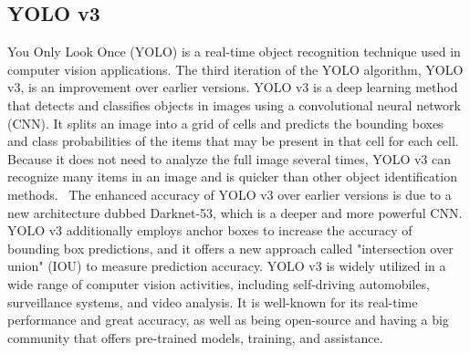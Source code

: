 \documentclass[11pt, a4paper, openany]{book}
\begin{document}
\subsection{YOLO v3}
You Only Look Once (YOLO) is a real-time object recognition technique used in computer vision applications. The third iteration of the YOLO algorithm, YOLO v3, is an improvement over earlier versions.
YOLO v3 is a deep learning method that detects and classifies objects in images using a convolutional neural network (CNN). It splits an image into a grid of cells and predicts the bounding boxes and class probabilities of the items that may be present in that cell for each cell. Because it does not need to analyze the full image several times, YOLO v3 can recognize many items in an image and is quicker than other object identification methods.~\cite{redmon2018yolov3}\newline
The enhanced accuracy of YOLO v3 over earlier versions is due to a new architecture dubbed Darknet-53, which is a deeper and more powerful CNN. YOLO v3 additionally employs anchor boxes to increase the accuracy of bounding box predictions, and it offers a new approach called "intersection over union" (IOU) to measure prediction accuracy.
YOLO v3 is widely utilized in a wide range of computer vision activities, including self-driving automobiles, surveillance systems, and video analysis. It is well-known for its real-time performance and great accuracy, as well as being open-source and having a big community that offers pre-trained models, training, and assistance.
\end{document}
